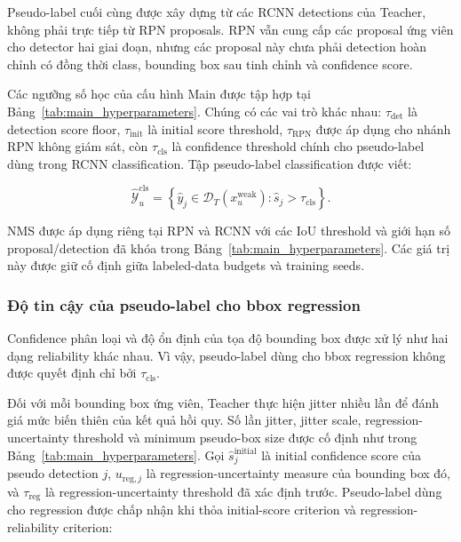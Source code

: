 \documentclass[pdflatex,sn-mathphys-num]{sn-jnl}%
\theoremstyle{thmstyleone}%
\theoremstyle{thmstyletwo}%
\theoremstyle{thmstylethree}%
\begin{document}
Pseudo-label cuối cùng được xây dựng từ các RCNN detections của Teacher,
không phải trực tiếp từ RPN proposals. RPN vẫn cung cấp các proposal ứng viên
cho detector hai giai đoạn, nhưng các proposal này chưa phải detection hoàn
chỉnh có đồng thời class, bounding box sau tinh chỉnh và confidence score.

Các ngưỡng số học của cấu hình Main được tập hợp tại
Bảng~\ref{tab:main_hyperparameters}. Chúng có các vai trò khác nhau:
\(\tau_{\mathrm{det}}\) là detection score floor,
\(\tau_{\mathrm{init}}\) là initial score threshold,
\(\tau_{\mathrm{RPN}}\) được áp dụng cho nhánh RPN không giám sát, còn
\(\tau_{\mathrm{cls}}\) là confidence threshold chính cho pseudo-label dùng
trong RCNN classification. Tập pseudo-label classification được viết:

\begin{equation}
\widehat{\mathcal{Y}}^{\mathrm{cls}}_u
=
\left\{
\hat{y}_j
\in
\mathcal{D}_{T}(x_u^{\mathrm{weak}})
:
\hat{s}_j>\tau_{\mathrm{cls}}
\right\}.
\label{eq:accepted_classification_pseudo_set}
\end{equation}

NMS được áp dụng riêng tại RPN và RCNN với các IoU threshold và giới hạn số
proposal/detection đã khóa trong Bảng~\ref{tab:main_hyperparameters}. Các giá trị này được giữ cố định giữa labeled-data budgets và training seeds.

\subsubsection{Độ tin cậy của pseudo-label cho bbox regression}
\label{subsubsec:pseudo_regression_reliability}

Confidence phân loại và độ ổn định của tọa độ bounding box được xử lý như
hai dạng reliability khác nhau. Vì vậy, pseudo-label dùng cho bbox regression
không được quyết định chỉ bởi \(\tau_{\mathrm{cls}}\).

Đối với mỗi bounding box ứng viên, Teacher thực hiện jitter nhiều lần để
đánh giá mức biến thiên của kết quả hồi quy. Số lần jitter, jitter scale,
regression-uncertainty threshold và minimum pseudo-box size được cố định như
trong Bảng~\ref{tab:main_hyperparameters}. Gọi
\(\hat{s}^{\mathrm{initial}}_j\) là initial confidence score của pseudo
detection \(j\), \(u_{\mathrm{reg},j}\) là regression-uncertainty measure
của bounding box đó, và \(\tau_{\mathrm{reg}}\) là regression-uncertainty
threshold đã xác định trước. Pseudo-label dùng cho regression được chấp nhận
khi thỏa initial-score criterion và regression-reliability criterion:
\end{document}
